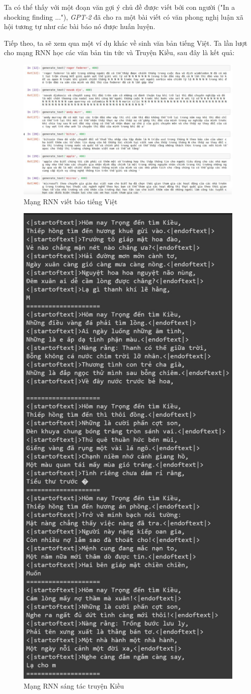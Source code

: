 Ta có thể thấy với một đoạn văn gợi ý chủ đề được viết bới con người ("In a shocking finding ..."), \textit{GPT-2} đã cho ra một bài viết có văn phong nghị luận xã hội tương tự như các bài báo nó được huấn luyện.

Tiếp theo, ta sẽ xem qua một ví dụ khác về sinh văn bản tiếng Việt. Ta lần lượt cho mạng RNN học các văn bản tin tức và Truyện Kiều, sau đây là kết quả:

\clearpage
\begin{figure}[h!]
	\centering
		\includegraphics[width=1\columnwidth]{chapter07/figure-sec3/vnm-news.png}
		\centering
	\caption{Mạng RNN viết báo tiếng Việt}
\end{figure}
\clearpage
\begin{figure}[h!]
	\centering
		\includegraphics[width=0.64\columnwidth]{chapter07/figure-sec3/kieu.jpg}
		\centering
	\caption{Mạng RNN sáng tác truyện Kiều}
\end{figure}
